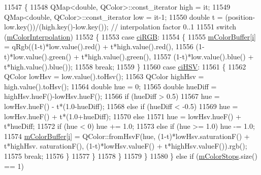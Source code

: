 \begin{DoxyCode}
11547       \{
11548         QMap<double, QColor>::const\_iterator high = it;
11549         QMap<double, QColor>::const\_iterator low = it-1;
11550         \textcolor{keywordtype}{double} t = (position-low.key())/(high.key()-low.key()); \textcolor{comment}{// interpolation factor 0..1}
11551         \textcolor{keywordflow}{switch} (\hyperlink{class_q_c_p_color_gradient_a028cef73d863800a9ee93ffd641cce01}{mColorInterpolation})
11552         \{
11553           \textcolor{keywordflow}{case} \hyperlink{class_q_c_p_color_gradient_ac5dca17cc24336e6ca176610e7f77fc1a5e30f725c9cfe93999e268a9f92afbe7}{ciRGB}:
11554           \{
11555             \hyperlink{class_q_c_p_color_gradient_af8b5f0739faa5f8295154d47ce38ecff}{mColorBuffer}[\hyperlink{_comparision_pictures_2_createtest_image_8m_a6f6ccfcf58b31cb6412107d9d5281426}{i}] = qRgb((1-t)*low.value().red() + t*high.value().red(),
11556                                    (1-t)*low.value().green() + t*high.value().green(),
11557                                    (1-t)*low.value().blue() + t*high.value().blue());
11558             \textcolor{keywordflow}{break};
11559           \}
11560           \textcolor{keywordflow}{case} \hyperlink{class_q_c_p_color_gradient_ac5dca17cc24336e6ca176610e7f77fc1af14ae62fcae11ecc07234eeaec5856cb}{ciHSV}:
11561           \{
11562             QColor lowHsv = low.value().toHsv();
11563             QColor highHsv = high.value().toHsv();
11564             \textcolor{keywordtype}{double} hue = 0;
11565             \textcolor{keywordtype}{double} hueDiff = highHsv.hueF()-lowHsv.hueF();
11566             \textcolor{keywordflow}{if} (hueDiff > 0.5)
11567               hue = lowHsv.hueF() - t*(1.0-hueDiff);
11568             \textcolor{keywordflow}{else} \textcolor{keywordflow}{if} (hueDiff < -0.5)
11569               hue = lowHsv.hueF() + t*(1.0+hueDiff);
11570             \textcolor{keywordflow}{else}
11571               hue = lowHsv.hueF() + t*hueDiff;
11572             \textcolor{keywordflow}{if} (hue < 0) hue += 1.0;
11573             \textcolor{keywordflow}{else} \textcolor{keywordflow}{if} (hue >= 1.0) hue -= 1.0;
11574             \hyperlink{class_q_c_p_color_gradient_af8b5f0739faa5f8295154d47ce38ecff}{mColorBuffer}[\hyperlink{_comparision_pictures_2_createtest_image_8m_a6f6ccfcf58b31cb6412107d9d5281426}{i}] = QColor::fromHsvF(hue, (1-t)*lowHsv.saturationF() + t*highHsv.
      saturationF(), (1-t)*lowHsv.valueF() + t*highHsv.valueF()).rgb();
11575             \textcolor{keywordflow}{break};
11576           \}
11577         \}
11578       \}
11579     \}
11580   \} \textcolor{keywordflow}{else} \textcolor{keywordflow}{if} (\hyperlink{class_q_c_p_color_gradient_a9e11a2b0974ef289d12c324822bc3a3e}{mColorStops}.size() == 1)

\end{DoxyCode}
